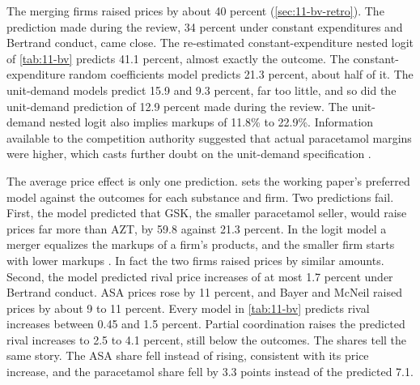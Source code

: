  The merging firms raised prices by about 40 percent (\cref{sec:11-bv-retro}).
The prediction made during
the review, 34 percent under constant expenditures and Bertrand conduct, came close. The re-estimated
constant-expenditure nested logit of \cref{tab:11-bv} predicts 41.1 percent, almost exactly the outcome. The
constant-expenditure random coefficients model predicts 21.3 percent, about half of it. The unit-demand models
predict 15.9 and 9.3 percent, far too little, and so did the unit-demand prediction of 12.9 percent made during the
review. The unit-demand nested logit also implies markups of 11.8\% to 22.9\%. Information available to the
competition authority suggested that actual paracetamol margins were higher, which casts further doubt on the
unit-demand specification \citep[p.~147]{BjornerstedtVerboven2016}.

The average price effect is only one prediction.  sets the working paper's preferred model
against the outcomes for each substance and firm. Two predictions fail. First, the model predicted that GSK, the
smaller paracetamol seller, would raise prices far more than AZT, by 59.8 against 21.3 percent. In the logit model a
merger equalizes the markups of a firm's products, and the smaller firm starts with lower markups
\citep[p.~26]{BjornerstedtVerboven2013}. In fact the two firms raised prices by similar amounts. Second, the model
predicted rival price increases of at most 1.7 percent under Bertrand conduct. ASA prices rose by 11 percent, and
Bayer and McNeil raised prices by about 9 to 11 percent. Every model in \cref{tab:11-bv} predicts rival increases
between 0.45 and 1.5 percent. Partial coordination raises the predicted rival increases to 2.5 to 4.1 percent, still
below the outcomes. The shares tell the same story. The ASA share fell instead of rising, consistent with its price
increase, and the paracetamol share fell by 3.3 points instead of the predicted 7.1.

